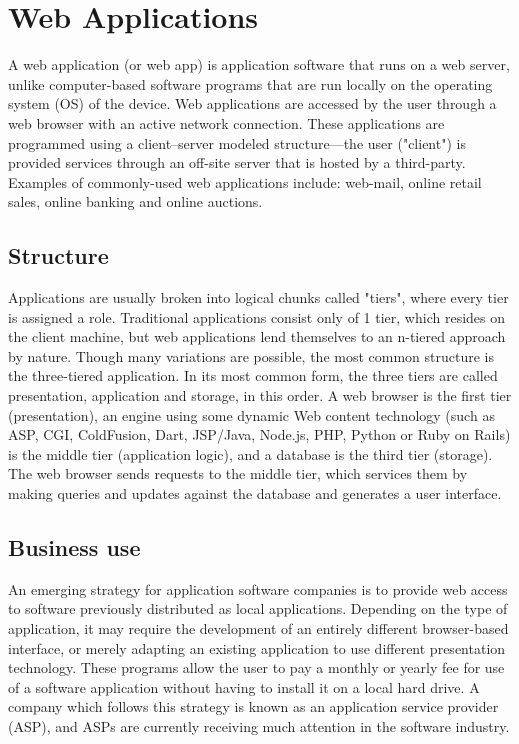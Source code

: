 \section{Web Applications}

A web application (or web app) is application software that runs on a web server, unlike computer-based software programs that are run locally on the operating system (OS) of the device. Web applications are accessed by the user through a web browser with an active network connection. These applications are programmed using a client–server modeled structure—the user ("client") is provided services through an off-site server that is hosted by a third-party. Examples of commonly-used web applications include: web-mail, online retail sales, online banking and online auctions.

\subsection{Structure}

Applications are usually broken into logical chunks called "tiers", where every tier is assigned a role. Traditional applications consist only of 1 tier, which resides on the client machine, but web applications lend themselves to an n-tiered approach by nature. Though many variations are possible, the most common structure is the three-tiered application.\cite{krunalMakeNtierArchitecture2008} In its most common form, the three tiers are called presentation, application and storage, in this order. A web browser is the first tier (presentation), an engine using some dynamic Web content technology (such as ASP, CGI, ColdFusion, Dart, JSP/Java, Node.js, PHP, Python or Ruby on Rails) is the middle tier (application logic), and a database is the third tier (storage). The web browser sends requests to the middle tier, which services them by making queries and updates against the database and generates a user interface\cite{krunalMakeNtierArchitecture2008}.

\subsection{Business use}

An emerging strategy for application software companies is to provide web access to software previously distributed as local applications. Depending on the type of application, it may require the development of an entirely different browser-based interface, or merely adapting an existing application to use different presentation technology. These programs allow the user to pay a monthly or yearly fee for use of a software application without having to install it on a local hard drive. A company which follows this strategy is known as an application service provider (ASP), and ASPs are currently receiving much attention in the software industry.


